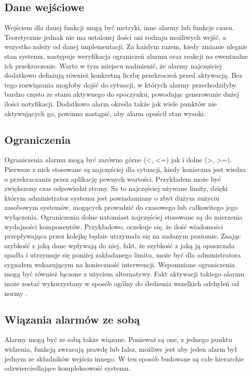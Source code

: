     \subsection{Dane wejściowe}
    Wejściem dla danej funkcji mogą być metryki, inne alarmy lub funkcje czasu. Teoretycznie jednak nie ma ustalonej
    ilości ani rodzaju możliwych wejść, a wszystko zależy od danej implementacji. Za każdym razem, kiedy 
    zmianie ulegnie stan systemu, następuje weryfikacja ograniczeń alarmu oraz reakcji na ewentualne ich
    przekroczenie. Warto w tym miejscu nadmienić, że alarmy najczęściej dodatkowo definiują również 
    konkretną liczbę przekroczeń przed aktywacją. Bez tego rozwiązania mogłoby dojść do sytuacji, w których
    alarmy przechodziłyby bardzo często ze stanu aktywnego do spoczynku, powodując generowanie dużej ilości notyfikacji. Dodatkowo alarm określa także jak wiele punktów nie aktywujących go, powinno
    nastąpić, aby alarm opuścił stan wysoki.
    
    \subsection{Ograniczenia}
    Ograniczenia alarmu mogą być zarówno górne (<, <=) jak i dolne (>, >=). Pierwsze z nich stosowane są
    najczęściej dla sytuacji, kiedy konieczna jest wiedza o przekraczaniu przez aplikację pewnych wartości.
    Przykładem może być zwiększony czas odpowiedzi strony. Sa to najczęściej używane limity, dzięki którym
    administrator systemu jest powiadamiany o zbyt dużym zużyciu zasobowym systemów, mogących prowadzić
    do czasowego lub całkowitego jego wyłączenia. Ograniczenia dolne natomiast najczęściej
    stosowane są do mierzenia wydajności komponentów. Przykładowo, oczekuje się, że ilość wiadomości
    przepływająca przez kolejkę będzie utrzymała się na zadanym poziomie. Znając szybkość z jaką dane 
    wpływają do niej, fakt, że szybkość z jaką ją opuszczała spadła i utrzymuje się poniżej zakładanego
    limitu, może być dla administratora sygnałem wskazującym na konieczność interwencji.
    Wspomniane ograniczenia mogą być również łączone z użyciem alternatywy. Fakt aktywacji takiego
    alarmu może zostać wykorzystany w sposób ogólny do śledzenia wszelkich odchyleń od normy \cite{monitoring_and_alerting}.
    
    \subsection{Wiązania alarmów ze sobą}
    Alarmy mogą być ze sobą  także wiązane. Ponieważ są one, z jednego punktu widzenia, funkcją
    zwracają prawdę lub fałsz, możliwe jest aby jeden alarm był jednym ze składników wejścia innego.
    W ten sposób budowane są całe hierarchie odzwierciedlające kompleksowość systemu. 
    
